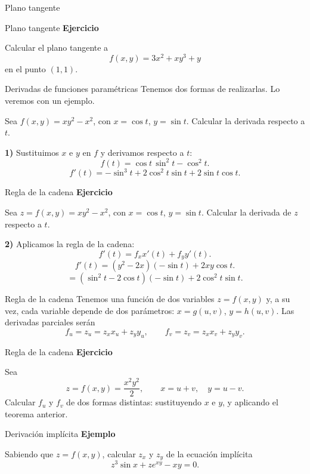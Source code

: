 \documentclass[original_version/main.tex]{subfiles}
\begin{document}
\begin{frame}{Plano tangente}
\end{frame}
\begin{frame}{Plano tangente}
\textbf{Ejercicio}\par Calcular el plano tangente a\[f(x,y)=3x^2+xy^3+y\]
en el punto $(1,1)$.
\end{frame}
\begin{frame}{Derivadas de funciones paramétricas}
\small Tenemos dos formas de realizarlas. Lo veremos con un ejemplo.
\medskip

Sea $f(x,y)=xy^2-x^2$, con $x=\cos t$, $y=\sin t$. Calcular la derivada respecto a $t$.
\medskip

\textbf{1)} Sustituimos $x$ e $y$ en $f$ y derivamos respecto a $t$:
\[f(t)=\cos t\,\sin^2t-\cos^2t.\]
\[f'(t)=-\sin^3t+2\cos^2t\sin t+2\sin t\cos t.\]
\end{frame}
\begin{frame}{Regla de la cadena}
\small\textbf{Ejercicio}\par Sea $z=f(x,y)=xy^2-x^2$, con $x=\cos t$, $y=\sin t$. Calcular la derivada de $z$ respecto a $t$.
\medskip

\textbf{2)} Aplicamos la regla de la cadena:
\[f'(t)=f_xx'(t)+f_yy'(t).\]
\[f'(t)=(y^2-2x)(-\sin t)+2xy\cos t.\]
\[=(\sin^2t-2\cos t)(-\sin t)+2\cos^2t\sin t.\]
\end{frame}
\begin{frame}{Regla de la cadena}
\small Tenemos una función de dos variables $z=f(x,y)$ y, a su vez, cada variable depende de dos parámetros: $x=g(u,v)$, $y=h(u,v)$. Las derivadas parciales serán
\[f_u=z_u=z_xx_u+z_yy_u,\qquad f_v=z_v=z_xx_v+z_yy_v.\]
\end{frame}
\begin{frame}{Regla de la cadena}
\textbf{Ejercicio}\par Sea
\[z=f(x,y)=\frac{x^2y^2}{2},\qquad x=u+v,\quad y=u-v.\]
Calcular $f_u$ y $f_v$ de dos formas distintas: sustituyendo $x$ e $y$, y aplicando el teorema anterior.
\end{frame}
\begin{frame}{Derivación implícita}
\textbf{Ejemplo}\par Sabiendo que $z=f(x,y)$, calcular $z_x$ y $z_y$ de la ecuación implícita
\[z^3\sin x+ze^{xy}-xy=0.\]
\end{frame}
\end{document}
